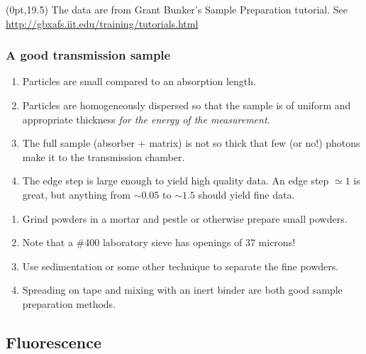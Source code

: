 \documentclass[10pt, xcolor=x11names, compress]{beamer}
\begin{document}
\begin{frame}
\begin{columns}
\begin{column}{0.4\linewidth}
    \end{column}
  \end{columns}
  \begin{textblock*}{0.5\linewidth}(0pt,19.5\TPVertModule)%
    \tiny%
    The data are from Grant Bunker's Sample Preparation tutorial.  See
    \href{http://gbxafs.iit.edu/training/tutorials.html}
    {\color{Purple3}http://gbxafs.iit.edu/training/tutorials.html}
  \end{textblock*}
\end{frame}

\begin{frame}
  \frametitle{A good transmission sample}
  \begin{enumerate}
  \item Particles are small compared to an absorption length.
  \item Particles are homogeneously dispersed so that the sample is of
    uniform and appropriate thickness \textit{for the energy of the
      measurement.}
  \item The full sample (absorber + matrix) is not so thick that few
    (or no!) photons make it to the transmission chamber.
  \item The edge step is large enough to yield high quality data.  An
    edge step $\simeq1$ is great, but anything from $\sim0.05$ to
    $\sim1.5$ should yield fine data.
  \end{enumerate}

  \bigskip

  \begin{enumerate}
  \item Grind powders in a mortar and pestle or otherwise prepare
    small powders.
  \item Note that a \#400 laboratory sieve has openings of \alert{37
      microns}!
  \item Use sedimentation or some other technique to separate the fine
    powders.
  \item Spreading on tape and mixing with an inert binder are both
    good sample preparation methods.
  \end{enumerate}
\end{frame}

\subsection{Fluorescence}
\end{document}
